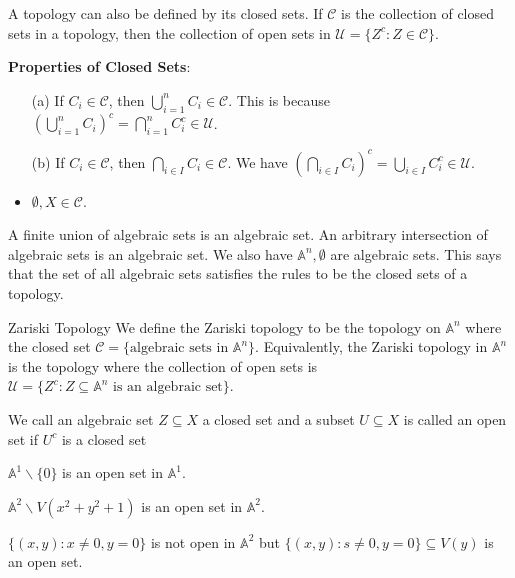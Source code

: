 \documentclass{report}
\begin{document}
A topology can also be defined by its closed sets. If $\mathcal{C}$ is the collection of closed sets in a topology, then the collection of open sets in $\mathcal{U} = \{Z^{c} : Z \in \mathcal{C}\}$.

\textbf{Properties of Closed Sets}:
    \begin{itemize}
        \item [(a)] If $C_{i} \in \mathcal{C}$, then $\bigcup_{i = 1}^{n} C_{i} \in \mathcal{C}$. This is because $(\bigcup_{i = 1}^{n} C_{i})^{c} = \bigcap_{i = 1}^{n} C_{i}^{c} \in \mathcal{U}$.

        \item [(b)] If $C_{i} \in \mathcal{C}$, then $\bigcap_{i \in I}^{} C_{i} \in \mathcal{C}$. We have $(\bigcap_{i \in I}^{} C_{i})^{c} = \bigcup_{i \in I}^{} C_{i}^{c} \in \mathcal{U}$.

        \item $\emptyset, X \in \mathcal{C}$.
    \end{itemize}

A finite union of algebraic sets is an algebraic set. An arbitrary intersection of algebraic sets is an algebraic set. We also have $\mathbb{A}^{n}, \emptyset$ are algebraic sets. This says that the set of all algebraic sets satisfies the rules to be the closed sets of a topology.

\begin{definition}{Zariski Topology}
    We define the Zariski topology to be the topology on $\mathbb{A}^{n}$ where the closed set $\mathcal{C} = \{\text{algebraic sets in $\mathbb{A}^{n}$}\}$. Equivalently, the Zariski topology in $\mathbb{A}^{n}$ is the topology where the collection of open sets is $\mathcal{U} = \{Z^{c} : Z \subseteq \mathbb{A}^{n} \text{ is an algebraic set}\}$.
\end{definition}

\begin{definition}{}
    We call an algebraic set $Z \subseteq X$ a closed set and a subset $U \subseteq X$ is called an open set if $U^{c}$ is a closed set
\end{definition}
    \begin{examples}
        \begin{example}
            $\mathbb{A}^{1}\backslash\{0\}$ is an open set in $\mathbb{A}^{1}$.
        \end{example}
        \begin{example}
            $\mathbb{A}^{2} \backslash V(x^{2} + y^{2} + 1)$ is an open set in $\mathbb{A}^{2}$.
        \end{example}
        \begin{example}
            $\{(x, y) : x \neq 0, y = 0\}$ is not open in $\mathbb{A}^{2}$ but $\{(x, y) : s \neq 0, y = 0\} \subseteq V(y)$ is an open set.
        \end{example}
    \end{examples}
\end{document}
